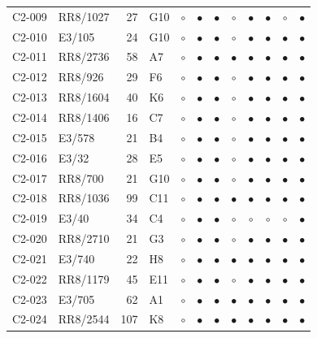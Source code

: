 {\begin{longtable}{llrp{3.9cm}cccccccc}
    C2-009 & RR8/1027 & 27 & G10 & $\circ$ & $\bullet$ & $\bullet$ & $\circ$ & $\bullet$ & $\bullet$ & $\circ$ & $\bullet$ \\
    C2-010 & E3/105 & 24 & G10 & $\circ$ & $\bullet$ & $\bullet$ & $\circ$ & $\bullet$ & $\bullet$ & $\bullet$ & $\bullet$ \\
    C2-011 & RR8/2736 & 58 & A7 & $\circ$ & $\bullet$ & $\bullet$ & $\bullet$ & $\bullet$ & $\bullet$ & $\bullet$ & $\bullet$ \\
    C2-012 & RR8/926 & 29 & F6 & $\circ$ & $\bullet$ & $\bullet$ & $\circ$ & $\bullet$ & $\bullet$ & $\bullet$ & $\bullet$ \\
    C2-013 & RR8/1604 & 40 & K6 & $\circ$ & $\bullet$ & $\bullet$ & $\circ$ & $\bullet$ & $\bullet$ & $\bullet$ & $\bullet$ \\
    C2-014 & RR8/1406 & 16 & C7 & $\circ$ & $\bullet$ & $\bullet$ & $\circ$ & $\bullet$ & $\bullet$ & $\bullet$ & $\bullet$ \\
    C2-015 & E3/578 & 21 & B4 & $\circ$ & $\bullet$ & $\bullet$ & $\circ$ & $\bullet$ & $\bullet$ & $\bullet$ & $\bullet$ \\
    C2-016 & E3/32 & 28 & E5 & $\circ$ & $\bullet$ & $\bullet$ & $\circ$ & $\bullet$ & $\bullet$ & $\bullet$ & $\bullet$ \\
    C2-017 & RR8/700 & 21 & G10 & $\circ$ & $\bullet$ & $\bullet$ & $\circ$ & $\bullet$ & $\bullet$ & $\bullet$ & $\bullet$ \\
    C2-018 & RR8/1036 & 99 & C11 & $\circ$ & $\bullet$ & $\bullet$ & $\bullet$ & $\bullet$ & $\bullet$ & $\bullet$ & $\bullet$ \\
    C2-019 & E3/40 & 34 & C4 & $\circ$ & $\bullet$ & $\bullet$ & $\circ$ & $\circ$ & $\circ$ & $\circ$ & $\bullet$ \\
    C2-020 & RR8/2710 & 21 & G3 & $\circ$ & $\bullet$ & $\bullet$ & $\circ$ & $\bullet$ & $\bullet$ & $\bullet$ & $\bullet$ \\
    C2-021 & E3/740 & 22 & H8 & $\circ$ & $\bullet$ & $\bullet$ & $\bullet$ & $\bullet$ & $\bullet$ & $\bullet$ & $\bullet$ \\
    C2-022 & RR8/1179 & 45 & E11 & $\circ$ & $\bullet$ & $\bullet$ & $\circ$ & $\bullet$ & $\bullet$ & $\bullet$ & $\bullet$ \\
    C2-023 & E3/705 & 62 & A1 & $\circ$ & $\bullet$ & $\bullet$ & $\bullet$ & $\bullet$ & $\bullet$ & $\bullet$ & $\bullet$ \\
    C2-024 & RR8/2544 & 107 & K8 & $\circ$ & $\bullet$ & $\bullet$ & $\bullet$ & $\bullet$ & $\bullet$ & $\bullet$ & $\bullet$ \\

\end{longtable}}
